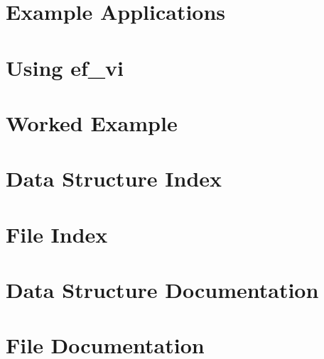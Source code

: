 \documentclass[twoside]{book}
\newcommand{\+}{}
\begin{document}
\chapter{Example Applications}
\label{applications}

\chapter{Using ef\+\_\+vi}
\label{using}

\chapter{Worked Example}
\label{example}

\chapter{Data Structure Index}

\chapter{File Index}

\chapter{Data Structure Documentation}
























\chapter{File Documentation}




















\backmatter
\newpage
{}
\cleardoublepage
{}
\printindex
\end{document}
